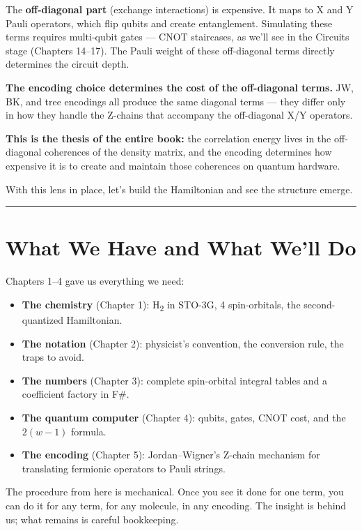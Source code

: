 \documentclass[
  11pt,
  oneside]{book}
\providecommand{\tightlist}{%
  \setlength{\itemsep}{0pt}\setlength{\parskip}{0pt}}
\begin{document}
The \textbf{off-diagonal part} (exchange interactions) is expensive. It
maps to X and Y Pauli operators, which flip qubits and create
entanglement. Simulating these terms requires multi-qubit gates --- CNOT
staircases, as we'll see in the Circuits stage (Chapters 14--17). The
Pauli weight of these off-diagonal terms directly determines the circuit
depth.

\textbf{The encoding choice determines the cost of the off-diagonal
terms.} JW, BK, and tree encodings all produce the same diagonal terms
--- they differ only in how they handle the Z-chains that accompany the
off-diagonal X/Y operators.

\textbf{This is the thesis of the entire book:} the correlation energy
lives in the off-diagonal coherences of the density matrix, and the
encoding determines how expensive it is to create and maintain those
coherences on quantum hardware.

With this lens in place, let's build the Hamiltonian and see the
structure emerge.

\begin{center}\rule{0.5\linewidth}{0.5pt}\end{center}

\section{What We Have and What We'll
Do}\label{what-we-have-and-what-well-do}

Chapters 1--4 gave us everything we need:

\begin{itemize}
\tightlist
\item
  \textbf{The chemistry} (Chapter 1): H\textsubscript{2} in STO-3G, 4 spin-orbitals, the
  second-quantized Hamiltonian.
\item
  \textbf{The notation} (Chapter 2): physicist's convention, the
  conversion rule, the traps to avoid.
\item
  \textbf{The numbers} (Chapter 3): complete spin-orbital integral
  tables and a coefficient factory in F\#.
\item
  \textbf{The quantum computer} (Chapter 4): qubits, gates, CNOT cost,
  and the \(2(w-1)\) formula.
\item
  \textbf{The encoding} (Chapter 5): Jordan--Wigner's Z-chain mechanism
  for translating fermionic operators to Pauli strings.
\end{itemize}

The procedure from here is mechanical. Once you see it done for one
term, you can do it for any term, for any molecule, in any encoding. The
insight is behind us; what remains is careful bookkeeping.
\end{document}
